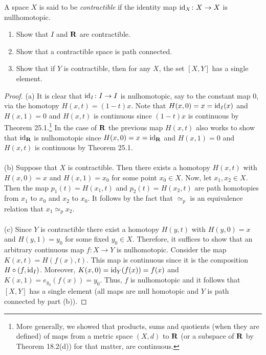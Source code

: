 \newpage
\begin{problem}[Munkres \S51, Ex.\,3(a,b,c,)]
A space $X$ is said to be \emph{contractible} if the identity map
$\operatorname{id}_X\colon X\to X$ is nullhomotopic.
\begin{enumerate}[label=(\alph*)]
\item Show that $I$ and $\mathbf{R}$ are contractible.
\item Show that a contractible space is path connected.
\item Show that if $Y$ is contractible, then for any $X$, the set
  $[X,Y]$ has a single element.
\end{enumerate}
\end{problem}
\begin{proof}
(a) It is clear that $\operatorname{id}_I\colon I\to I$ is nulhomotopic, say to the
constant map $0$, via the homotopy $H(x,t)=(1-t)x$. Note that
$H(x,0)=x=\operatorname{id}_I(x)$ and $H(x,1)=0$ and $H(x,t)$ is continuous since
$(1-t)x$ is continuous by Theorem 25.1.\footnote{More generally, we showed
  that products, sums and quotients (when they are defined) of maps from a
  metric space $(X,d)$ to $\mathbf{R}$ (or a subspace of $\mathbf{R}$ by
  Theorem 18.2(d)) for that matter, are continuous.} In the case of $\mathbf{R}$
the previous map $H(x,t)$ also works to show that $\operatorname{id}_{\mathbf{R}}$ is
nulhomotopic since $H(x,0)=x=\operatorname{id}_{\mathbf{R}}$ and $H(x,1)=0$ and $H(x,t)$ is
continuous by Theorem 25.1.
\\\\
(b) Suppose that $X$ is contractible. Then there exists a homotopy $H(x,t)$
with $H(x,0)=x$ and $H(x,1)=x_0$ for some point $x_0\in X$. Now, let
$x_1,x_2\in X$. Then the map $p_1(t)=H(x_1,t)$ and $p_2(t)=H(x_2,t)$ are
path homotopies from $x_1$ to $x_0$ and $x_2$ to $x_0$. It follows by the
fact that $\simeq_p$ is an equivalence relation that $x_1\simeq_p x_2$.
\\\\
(c) Since $Y$ is contractible there exist a homotopy $H(y,t)$ with
$H(y,0)=x$ and $H(y,1)=y_0$ for some fixed $y_0\in X$. Therefore, it
suffices to show that an arbitrary continuous map $f\colon X\to Y$ is
nulhomotopic. Consider the map $K(x,t)=H(f(x),t)$. This map is continuous
since it is the composition $H\circ (f,\operatorname{id}_I)$. Moreover,
$K(x,0)=\operatorname{id}_Y(f(x))=f(x)$ and $K(x,1)=e_{y_0}(f(x))=y_0$. Thus, $f$ is
nulhomotopic and it follows that $[X,Y]$ has a single element (all maps are
null homotopic and $Y$ is path connected by part (b)).
\end{proof}

